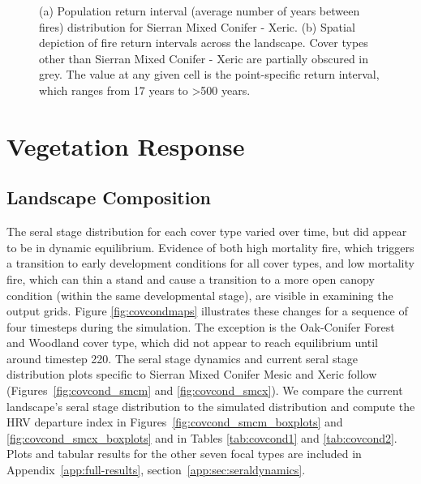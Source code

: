\begin{figure}[!htbp]
  \centering
  \caption{(a) Population return interval (average number of years between fires) distribution for Sierran Mixed Conifer - Xeric.  (b) Spatial depiction of fire return intervals across the landscape. Cover types other than Sierran Mixed Conifer - Xeric are partially obscured in grey. The value at any given cell is the point-specific return interval, which ranges from 17 years to \textgreater 500 years.}
\label{fig:preturn_smcx}
\end{figure}

\clearpage



\section{Vegetation Response}
\label{subsec:HRVvegresponse}

\subsection{Landscape Composition} 


The seral stage distribution for each cover type varied over time, but did appear to be in dynamic equilibrium. Evidence of both high mortality fire, which triggers a transition to early development conditions for all cover types, and low mortality fire, which can thin a stand and cause a transition to a more open canopy condition (within the same developmental stage), are visible in examining the output grids. Figure \ref{fig:covcondmaps} illustrates these changes for a sequence of four timesteps during the simulation. The exception is the Oak-Conifer Forest and Woodland cover type, which did not appear to reach equilibrium until around timestep 220. The seral stage dynamics and current seral stage distribution plots specific to Sierran Mixed Conifer Mesic and Xeric follow (Figures~\ref{fig:covcond_smcm} and \ref{fig:covcond_smcx}).  We compare the current landscape's seral stage distribution to the simulated distribution and compute the HRV departure index in Figures~\ref{fig:covcond_smcm_boxplots} and \ref{fig:covcond_smcx_boxplots} and in Tables \ref{tab:covcond1} and \ref{tab:covcond2}. Plots and tabular results for the other seven focal types are included in Appendix~\ref{app:full-results}, section~\ref{app:sec:seraldynamics}.


